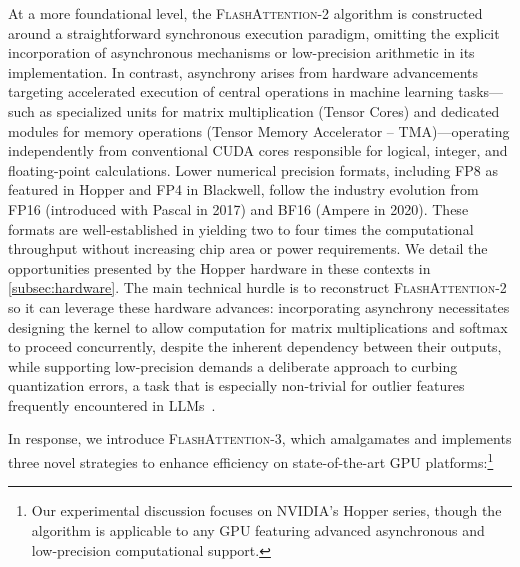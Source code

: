 At a more foundational level, the \textsc{FlashAttention-2} algorithm is constructed around a straightforward synchronous execution paradigm, omitting the explicit incorporation of asynchronous mechanisms or low-precision arithmetic in its implementation. In contrast, asynchrony arises from hardware advancements targeting accelerated execution of central operations in machine learning tasks—such as specialized units for matrix multiplication (Tensor Cores) and dedicated modules for memory operations (Tensor Memory Accelerator -- TMA)—operating independently from conventional CUDA cores responsible for logical, integer, and floating-point calculations. Lower numerical precision formats, including FP8 as featured in Hopper and FP4 in Blackwell, follow the industry evolution from FP16 (introduced with Pascal in 2017) and BF16 (Ampere in 2020). These formats are well-established in yielding two to four times the computational throughput without increasing chip area or power requirements. We detail the opportunities presented by the Hopper hardware in these contexts in \cref{subsec:hardware}. The main technical hurdle is to reconstruct \textsc{FlashAttention-2} so it can leverage these hardware advances: incorporating asynchrony necessitates designing the kernel to allow computation for matrix multiplications and softmax to proceed concurrently, despite the inherent dependency between their outputs, while supporting low-precision demands a deliberate approach to curbing quantization errors, a task that is especially non-trivial for outlier features frequently encountered in LLMs~\citep{dettmers2208llm, sun2024massive}.

In response, we introduce \textsc{FlashAttention-3}, which amalgamates and implements three novel strategies to enhance efficiency on state-of-the-art GPU platforms:\footnote{Our experimental discussion focuses on NVIDIA's Hopper series, though the algorithm is applicable to any GPU featuring advanced asynchronous and low-precision computational support.}

